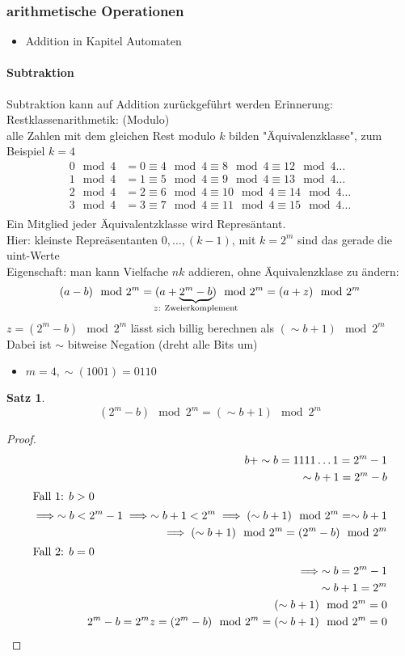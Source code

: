 \documentclass[a4paper]{scrartcl}
\theoremstyle{definition}
\theoremstyle{plain}
\newtheorem{thm}{Satz}
\theoremstyle{remark}
\theoremstyle{remark}
\begin{document}
\subsubsection{arithmetische Operationen}
\label{sec-16-1-2}
\begin{itemize}
\item Addition in Kapitel Automaten \\
\end{itemize}
\paragraph{Subtraktion}
\label{sec-16-1-2-1}
Subtraktion kann auf Addition zurückgeführt werden
Erinnerung: Restklassenarithmetik: (Modulo) \\
         alle Zahlen mit dem gleichen Rest modulo $k$ bilden "Äquivalenzklasse", zum Beispiel $k = 4$
\begin{align*}
0 \mod 4 &= 0 \equiv 4 \mod 4 \equiv 8 \mod 4 \equiv 12 \mod 4 \ldots \\
1 \mod 4 &= 1 \equiv 5 \mod 4 \equiv 9 \mod 4 \equiv 13 \mod 4 \ldots \\
2 \mod 4 &= 2 \equiv 6 \mod 4 \equiv 10 \mod 4 \equiv 14 \mod 4 \ldots \\
3 \mod 4 &= 3 \equiv 7 \mod 4 \equiv 11 \mod 4 \equiv 15 \mod 4 \ldots \\
\end{align*}
Ein Mitglied jeder Äquivalentzklasse wird Represäntant. \\
         Hier: kleinste Repreäsentanten $0, \ldots, (k - 1)$, mit $k = 2^m$
sind das gerade die uint-Werte \\
         Eigenschaft: man kann Vielfache $n k$ addieren, ohne Äquivalenzklase zu ändern: \\
         \[ (a - b) \mod 2^m = (a + \underbrace{2^m - b}_{\mathclap{z:~\text{Zweierkomplement}}}) \mod 2^m = (a + z) \mod 2^m \]
$z = (2^m - b) \mod 2^m$ lässt sich billig berechnen als $(\sim b + 1) \mod 2^m$
Dabei ist $\sim$ bitweise Negation (dreht alle Bits um)
\begin{itemize}
\item $m = 4, \sim(1001) = 0110$
\end{itemize}
\begin{thm}
\[(2^m - b) \mod 2^m = (\sim b + 1) \mod 2^m\]
\end{thm}
\begin{proof}
\begin{align*}
b + \sim b = 1111\ldots 1 = 2^m - 1 \\
\sim b + 1 = 2^{m} - b \\
\intertext{Fall 1: $b > 0$}
\implies \sim b < 2^m - 1 \implies \sim b + 1 < 2^m \implies (\sim b + 1) \mod 2^m = \sim b + 1 \\
\implies (\sim b + 1) \mod 2^m = (2^m - b) \mod 2^m \\
\intertext{Fall 2: $b = 0$}
\implies \sim b = 2^m - 1 \\
\sim b + 1 = 2^m \\
(\sim b + 1) \mod 2^m = 0 \\
2^m - b = 2^m
z = (2^m - b) \mod 2^m = (\sim b + 1) \mod 2^m = 0
\end{align*}
\end{proof}
\end{document}
